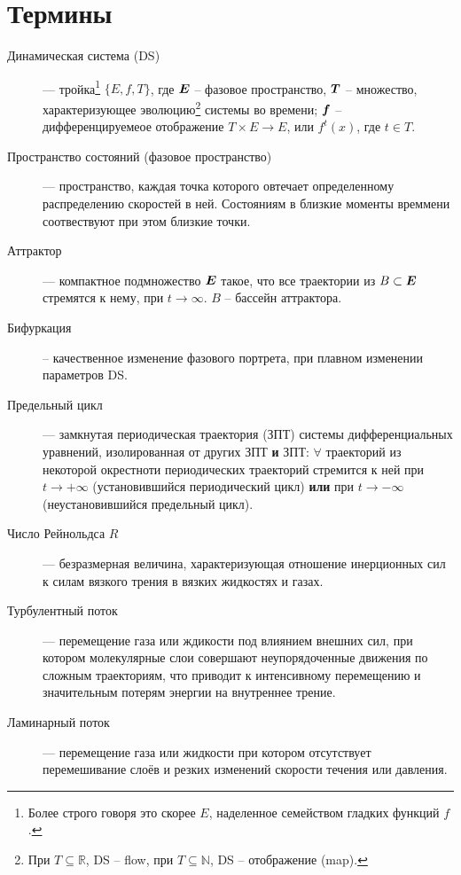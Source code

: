 \phantom{42}

\phantom{42}

\phantom{42}

\phantom{42}

\phantom{42}

\phantom{42}

\section*{Термины}

\begin{description}
    \item[Динамическая система (DS)] ---  тройка\footnote{
    Более строго говоря это  скорее $E$, наделенное семейством гладких функций $f$.
    } $\{E, f, T\}$, где 
        $\mbox{\boldmath $E$}$ -- фазовое пространство,  
        $\mbox{\boldmath $T$}$ -- множество, характеризующее эволюцию\footnote{
            При $T \subseteq \mathbb{R}$, DS -- flow, при $T \subseteq \mathbb{N}$, DS -- отображение (map).
        } системы во времени;
        $\mbox{\boldmath $f$}$ -- дифференцируемеое отображение $T \times E \to E$, или $f^{t}(x)$, где $t \in T$.
    \item[Пространство состояний (фазовое пространство)] --- пространство, каждая точка которого овтечает определенному распределению скоростей в ней. Состояниям в близкие моменты времмени соотвествуют при этом близкие точки.
    \item[Аттрактор] --- компактное подмножество $\mbox{\boldmath $E$}$ такое, что  все траектории из $B \subset \mbox{\boldmath $E$}$ стремятся к нему, при $t \to \infty$. $B$ -- бассейн аттрактора.
    \item[Бифуркация] -- качественное изменение фазового портрета, при плавном изменении параметров DS. 
    \item[Предельный цикл] --- замкнутая периодическая траектория (ЗПТ) системы дифференциальных уравнений, изолированная от других ЗПТ \textbf{и} ЗПТ: $\forall$ траекторий из некоторой окрестноти периодических траекторий стремится к ней при $t \longrightarrow + \infty$ (установившийся периодический цикл) \textbf{или} при $t \longrightarrow - \infty$ (неустановившийся предельный цикл).
    \item[Число Рейнольдса $R$] --- безразмерная величина, характеризующая отношение инерционных сил к силам вязкого трения в вязких жидкостях и газах.
    \item[Турбулентный поток] --- перемещение газа или ждикости под влиянием внешних сил, при котором молекулярные слои совершают неупорядоченные движения по сложным траекториям, что приводит к интенсивному перемещению и значительным потерям энергии на внутреннее трение.
    \item[Ламинарный поток] --- перемещение газа или жидкости при котором отсутствует перемешивание слоёв и резких изменений скорости течения или давления.
\end{description}

\newpage
